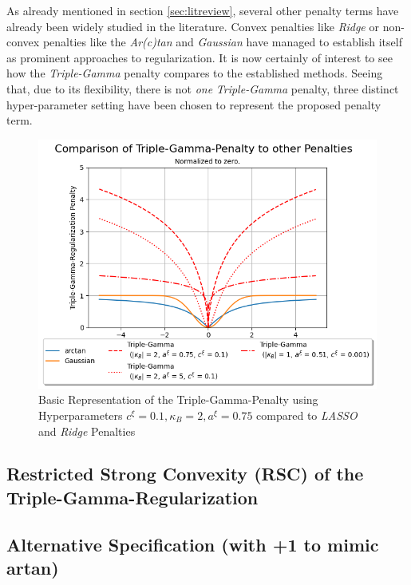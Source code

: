 \documentclass[12pt,a4paper]{article}
\begin{document}
As already mentioned in section \ref{sec:litreview}, several other penalty terms have already been widely studied in the literature. Convex penalties like \textit{Ridge} \parencite{HoerlKennard1970a} or non-convex penalties like the \textit{Ar(c)tan} \parencite{WangZhu2016} and \textit{Gaussian} \parencite{JohnVettamWu2022} have managed to establish itself as prominent approaches to regularization. It is now certainly of interest to see how the \textit{Triple-Gamma} penalty compares to the established methods. Seeing that, due to its flexibility, there is not \textit{one} \textit{Triple-Gamma} penalty, three distinct hyper-parameter setting have been chosen to represent the proposed penalty term. 

\begin{figure}[!h]
\centering
\includegraphics[scale=0.75]{../02_simulation/021_simulation_figures/TGPenalty_Comparison.png}
\caption{Basic Representation of the Triple-Gamma-Penalty using Hyperparameters $c^\xi = 0.1, \kappa_B = 2, a^\xi = 0.75$ compared to \textit{LASSO} and \textit{Ridge} Penalties}
\label{fig:basicTGPen}
\end{figure}

\subsection{Restricted Strong Convexity (RSC) of the Triple-Gamma-Regularization}

\subsection{Alternative Specification (with +1 to mimic artan)}
\end{document}
